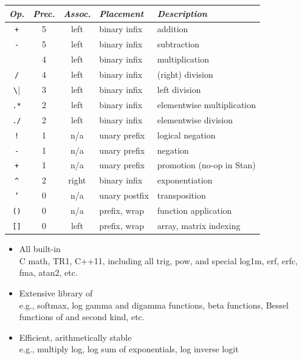 \documentclass[10pt]{report}
\newcommand{\sld}[1]{\newpage{\noindent\LARGE \ \ \
    \textcolor{MidnightBlue}{\bfseries #1}}\vspace*{4pt}}
\newcommand{\code}[1]{{\tt #1}}
\newcommand{\spc}{\hspace*{0.25in}}
\newcommand{\myemph}[1]{{\color{MidnightBlue}{\bfseries #1}}}
\begin{document}
\sld{Arithmetic and Matrix Operators}
\vfill
\noindent\spc
{\footnotesize
\begin{tabular}{c|ccl|l}
{\it Op.} & {\it Prec.} & {\it Assoc.} & {\it
  Placement} & {\it Description}
\\ \hline \hline

\code{+} & 5 & left & binary infix & addition
\\
\code{-} & 5 & left & binary infix & subtraction
\\ \hline
\code{*} & 4 & left & binary infix & multiplication
\\
\code{/} & 4 & left & binary infix & (right) division
\\ \hline
\Verb|\| & 3 & left & binary infix & left division
\\ \hline
\code{.*} & 2 & left & binary infix & elementwise multiplication
\\
\code{./} & 2 & left & binary infix & elementwise division
\\ \hline
\code{!} & 1 & n/a & unary prefix & logical negation
\\
\code{-} & 1 & n/a & unary prefix & negation
\\ 
\code{+} & 1 & n/a & unary prefix & promotion (no-op in Stan)
\\ \hline
\Verb|^| & 2 & right & binary infix & exponentiation
\\ \hline
\code{'} & 0 & n/a & unary postfix & transposition
\\ \hline \hline
\code{()} & 0 & n/a & prefix, wrap & function application
\\
\code{[]} & 0 & left & prefix, wrap & array, matrix indexing
\end{tabular}
}
\vfill

\sld{Built-in Math Functions}

\begin{itemize}
\item All built-in \myemph{C++ functions and operators}
\\
{\footnotesize C math, TR1, C++11, including all trig, pow, and
  special log1m, erf, erfc, fma, atan2, etc.}
\item Extensive library of \myemph{statistical functions}
\\
{\footnotesize e.g., softmax,
log gamma and digamma functions, beta functions, Bessel functions of
 and second kind, etc.}
%
\item Efficient, arithmetically stable \myemph{compound functions}
\\
{\footnotesize e.g., multiply log, log sum of
exponentials, log inverse logit}
\end{itemize}
\end{document}
